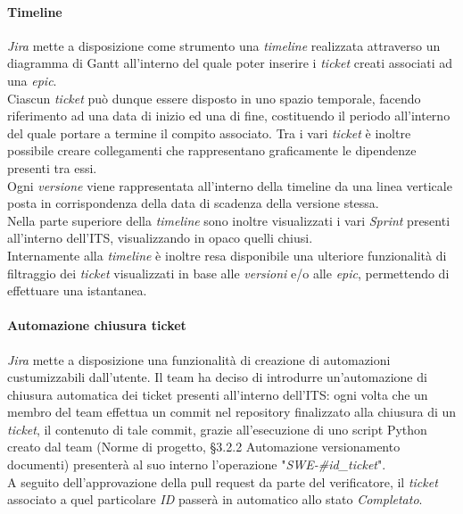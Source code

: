 \documentclass[10pt, a4paper]{article}
\begin{document}
\paragraph{Timeline}
\textit{Jira} mette a disposizione come strumento una \textit{timeline} realizzata attraverso un diagramma di Gantt all'interno del quale poter inserire i \textit{ticket}
creati associati ad una \textit{epic}.\\
Ciascun \textit{ticket} può dunque essere disposto in uno spazio temporale, facendo riferimento ad una data di inizio ed una di fine, costituendo il periodo
all'interno del quale portare a termine il compito associato. Tra i vari \textit{ticket} è inoltre possibile creare collegamenti che rappresentano graficamente 
le dipendenze presenti tra essi.\\
Ogni \textit{versione} viene rappresentata all'interno della timeline da una linea verticale posta in corrispondenza della data di scadenza
della versione stessa.\\
Nella parte superiore della \textit{timeline} sono inoltre visualizzati i vari \textit{Sprint} presenti all'interno dell'ITS, visualizzando in opaco quelli chiusi.\\
Internamente alla \textit{timeline} è inoltre resa disponibile una ulteriore funzionalità di filtraggio dei \textit{ticket} visualizzati in base alle \textit{versioni} e/o alle \textit{epic},
permettendo di effettuare una istantanea.

\paragraph{Automazione chiusura ticket} \textit{Jira} mette a disposizione una funzionalità di creazione di automazioni custumizzabili dall'utente.
Il team ha deciso di introdurre un'automazione di chiusura automatica dei ticket presenti all'interno dell'ITS: ogni volta che un membro del team 
effettua un commit nel repository finalizzato alla chiusura di un \textit{ticket}, il contenuto di tale commit, grazie all'esecuzione di uno script Python creato dal team (Norme di progetto, \S 3.2.2 Automazione versionamento documenti)
presenterà al suo interno l'operazione "\textit{SWE-\#id\_ticket}".\\
A seguito dell'approvazione della pull request da parte del verificatore, il \textit{ticket} associato a quel particolare \textit{ID} passerà in automatico
allo stato \textit{Completato}.
\end{document}

